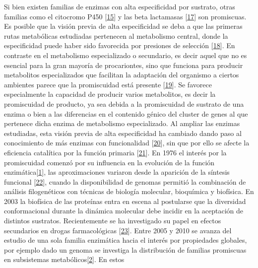 \documentclass[12pt,twoside]{reedthesis}
\begin{document}
  Si bien existen familias de enzimas con alta especificidad por sustrato,
  otras familias como el citocromo P450
  {[}\protect\hyperlink{ref-bloom_neutral_2007}{15}{]} y las beta
  lactamasas {[}\protect\hyperlink{ref-zou_evolution_2015}{17}{]} son
  promiscuas. Es posible que la visión previa de alta especificidad se
  deba a que las primeras rutas metabólicas estudiadas pertenecen al
  metabolismo central, donde la especificidad puede haber sido favorecida
  por presiones de selección
  {[}\protect\hyperlink{ref-firn_darwinian_2009}{18}{]}. En contraste en
  el metabolismo especializado o secundario, es decir aquel que no es
  esencial para la gran mayoría de procariontes, sino que funciona para
  producir metabolitos especializados que facilitan la adaptación del
  organismo a ciertos ambientes parece que la promiscuidad está presente
  {[}\protect\hyperlink{ref-weng_promiscuity_specialized_pathways_2012}{19}{]}.
  Se favorece especialmente la capacidad de producir varios metabolitos,
  es decir la promiscuidad de producto, ya sea debida a la promiscuidad de
  sustrato de una enzima o bien a las diferencias en el contenido génico
  del cluster de genes al que pertenece dicha enzima de metabolismo
  especializado. Al ampliar las enzimas estudiadas, esta visión previa de
  alta especificidad ha cambiado dando paso al conocimiento de más enzimas
  con funcionalidad
  {[}\protect\hyperlink{ref-jia_multifunctional_2013}{20}{]}, sin que por
  ello se afecte la eficiencia catalítica por la función primaria
  {[}\protect\hyperlink{ref-aharoni_evolvability_2005}{21}{]}. En 1976 el
  interés por la promiscuidad comenzó por su influencia en la evolución de
  la función
  enzimática{[}\protect\hyperlink{ref-jensen_enzyme_1976}{1}{]}, las
  aproximaciones variaron desde la aparición de la síntesis funcional
  {[}\protect\hyperlink{ref-dean_mechanistic_2007}{22}{]}, cuando la
  disponibilidad de genomas permitió la combinación de análisis
  filogenéticos con técnicas de biología molecular, bioquímica y
  biofísica. En 2003 la biofísica de las proteínas entra en escena al
  postularse que la diversidad conformacional durante la dinámica
  molecular debe incidir en la aceptación de distintos sustratos.
  Recientemente se ha investigado su papel en efectos secundarios en
  drogas farmacológicas
  {[}\protect\hyperlink{ref-nobeli_protein_2009}{23}{]}. Entre 2005 y 2010
  se avanza del estudio de una sola familia enzimática hacia el interés
  por propiedades globales, por ejemplo dado un genoma se investiga la
  distribución de familias promiscuas en subsistemas
  metabólicos{[}\protect\hyperlink{ref-nam_network_2012}{2}{]}. En estos
\end{document}
